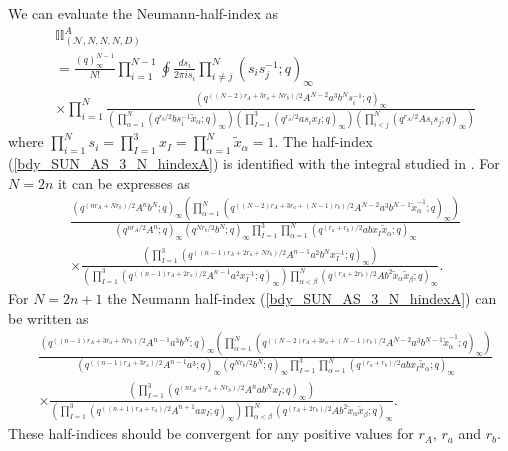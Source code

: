 \documentclass[12pt]{article}
\numberwithin{equation}{section}
\begin{document}
We can evaluate the Neumann-half-index as 
\begin{align}
\label{bdy_SUN_AS_3_N_hindexA}
&\mathbb{II}_{(\mathcal{N},N,N,N,D)}^{A}
\nonumber\\
&=\frac{(q)_{\infty}^{N-1}}{N!} \prod_{i=1}^{N-1} \oint \frac{ds_i}{2\pi i s_i}
\prod_{i \ne j}^N (s_i s_j^{-1}; q)_{\infty} 
\nonumber \\
&\times \prod_{i = 1}^N \frac{(q^{((N-2)r_A + 3r_a + Nr_b)/2} A^{N-2} a^3 b^N s_i^{-1}; q)_{\infty}}{\left( \prod_{\alpha = 1}^N (q^{r_b/2} b s_i^{-1} \tilde{x}_{\alpha}; q)_{\infty} \right) \left( \prod_{I = 1}^3 (q^{r_a/2} a s_i x_I; q)_{\infty} \right) \left( \prod_{i < j}^N (q^{r_A/2} A s_i s_j; q)_{\infty} \right)}
\end{align}
where $\prod_{i=1}^N s_i = \prod_{I = 1}^3 x_I = \prod_{\alpha = 1}^N \tilde{x}_{\alpha} = 1$. 
The half-index (\ref{bdy_SUN_AS_3_N_hindexA}) is identified with the integral studied in \cite{MR1811060}. 
For $N=2n$ it can be expresses as
\begin{align}
\label{bdy_SUN_AS_3_N_hindexB1}
&
\frac{\left( q^{(nr_A + Nr_b)/2} A^n b^N; q \right)_{\infty} \left( \prod_{\alpha = 1}^N \left( q^{((N-2)r_A + 3r_a + (N-1)r_b)/2} A^{N-2} a^3 b^{N-1} \tilde{x}_{\alpha}^{-1};q \right)_{\infty} \right)}
 {\left( q^{nr_A/2} A^n; q \right)_{\infty} \left( q^{Nr_b/2} b^N; q \right)_{\infty} \prod_{I = 1}^3 \prod_{\alpha = 1}^N (q^{(r_a + r_b)/2} ab x_I \tilde{x}_{\alpha}; q)_{\infty}}
\nonumber \\
&\times \frac{\left( \prod_{I = 1}^3 \left( q^{((n-1)r_A + 2r_a + Nr_b)/2} A^{n-1} a^2 b^N x_I^{-1};q \right)_{\infty} \right)}
 {\left( \prod_{I = 1}^3 \left( q^{((n-1)r_A + 2r_a)/2} A^{n-1} a^2 x_I^{-1}; q \right)_{\infty} \right) \prod_{\alpha < \beta}^N (q^{(r_A + 2r_b)/2} A b^2 \tilde{x}_{\alpha} \tilde{x}_{\beta}; q)_{\infty}}. 
\end{align}
For $N=2n+1$ the Neumann half-index (\ref{bdy_SUN_AS_3_N_hindexA}) can be written as
\begin{align}
\label{bdy_SUN_AS_3_N_hindexB2}
&
\frac{\left( q^{((n-1)r_A + 3r_a + Nr_b)/2} A^{n-1} a^3 b^N; q \right)_{\infty} \left( \prod_{\alpha = 1}^N \left( q^{((N-2)r_A + 3r_a + (N-1)r_b)/2} A^{N-2} a^3 b^{N-1} \tilde{x}_{\alpha}^{-1};q \right)_{\infty} \right)}
 {\left( q^{((n-1)r_A + 3r_a)/2} A^{n-1} a^3; q \right)_{\infty} \left( q^{Nr_b/2} b^N; q \right)_{\infty} \prod_{I = 1}^3 \prod_{\alpha = 1}^N (q^{(r_a + r_b)/2} ab x_I \tilde{x}_{\alpha}; q)_{\infty}} \nonumber \\
&\times \frac{\left( \prod_{I = 1}^3 \left( q^{(nr_A + r_a + Nr_b)/2} A^n a b^N x_I;q \right)_{\infty} \right)}
 {\left( \prod_{I = 1}^3 \left( q^{((n+1)r_A + r_a)/2} A^{n+1} a x_I; q \right)_{\infty} \right) \prod_{\alpha < \beta}^N (q^{(r_A + 2r_b)/2} A b^2 \tilde{x}_{\alpha} \tilde{x}_{\beta}; q)_{\infty}}. 
\end{align}
These half-indices should be convergent for any positive values for
$r_A$, $r_a$ and $r_b$.
\end{document}
